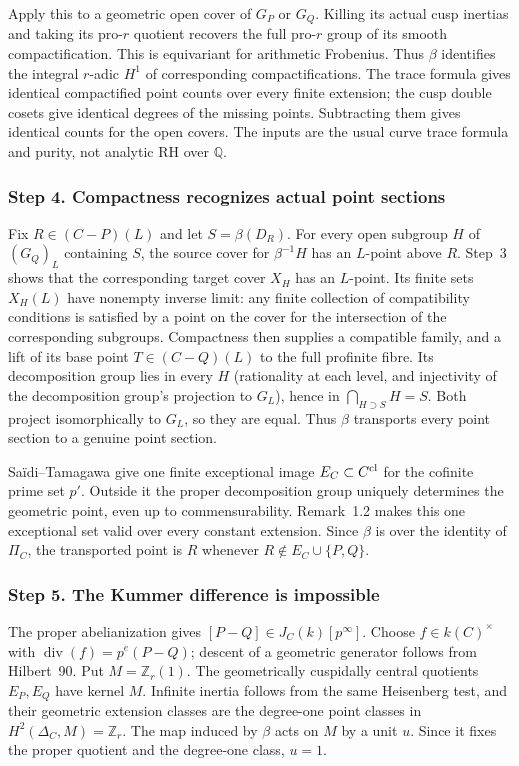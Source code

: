 Apply this to a geometric open cover of $G_P$ or $G_Q$. Killing
its actual cusp inertias and taking its pro-$r$ quotient recovers
the full pro-$r$ group of its smooth compactification. This is
equivariant for arithmetic Frobenius. Thus $\beta$ identifies
the integral $r$-adic $H^1$ of corresponding compactifications.
The trace formula gives identical compactified point counts over
every finite extension; the cusp double cosets give identical
degrees of the missing points. Subtracting them gives identical
counts for the open covers. The inputs are the usual curve trace
formula and purity, not analytic RH over $\mathbb Q$.

\subsubsection*{Step 4. Compactness recognizes actual point sections}
Fix $R\in(C-P)(L)$ and let $S=\beta(D_R)$. For every open
subgroup $H$ of $(G_Q)_L$ containing $S$, the source cover for
$\beta^{-1}H$ has an $L$-point above $R$. Step~3 shows that the
corresponding target cover $X_H$ has an $L$-point. Its finite
sets $X_H(L)$ have nonempty inverse limit: any finite collection
of compatibility conditions is satisfied by a point on the cover
for the intersection of the corresponding subgroups. Compactness
then supplies a compatible family, and a lift of its base point
$T\in(C-Q)(L)$ to the full profinite fibre. Its decomposition
group lies in every $H$ (rationality at each level, and injectivity
of the decomposition group's projection to $G_L$), hence in
$\bigcap_{H\supset S}H=S$. Both project isomorphically to $G_L$,
so they are equal. Thus $\beta$ transports every point section
to a genuine point section.

Sa\"idi--Tamagawa \cite[Definitions~1.3, 1.5, 1.10 and
Proposition~1.8(vi)]{ST2009} give one finite exceptional image
$E_C\subset C^{\rm cl}$ for the cofinite prime set $p'$.
Outside it the proper decomposition group uniquely determines
the geometric point, even up to commensurability. Remark~1.2
makes this one exceptional set valid over every constant extension.
Since $\beta$ is over the identity of $\Pi_C$, the transported
point is $R$ whenever $R\notin E_C\cup\{P,Q\}$.

\subsubsection*{Step 5. The Kummer difference is impossible}
The proper abelianization gives $[P-Q]\in J_C(k)[p^\infty]$.
Choose $f\in k(C)^\times$ with
$\operatorname{div}(f)=p^e(P-Q)$; descent of a geometric
generator follows from Hilbert~90. Put $M=\mathbb Z_r(1)$.
The geometrically cuspidally central quotients $E_P,E_Q$ have
kernel $M$. Infinite inertia follows from the same Heisenberg
test, and their geometric extension classes are the degree-one
point classes in $H^2(\Delta_C,M)=\mathbb Z_r$.
The map induced by $\beta$ acts on $M$ by a unit $u$.
Since it fixes the proper quotient and the degree-one class,
$u=1$.

